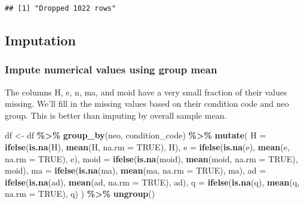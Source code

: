 \documentclass[
]{article}
\newenvironment{Shaded}{\begin{snugshade}}{\end{snugshade}}
\newcommand{\AttributeTok}[1]{\textcolor[rgb]{0.13,0.29,0.53}{#1}}
\newcommand{\ConstantTok}[1]{\textcolor[rgb]{0.56,0.35,0.01}{#1}}
\newcommand{\FunctionTok}[1]{\textcolor[rgb]{0.13,0.29,0.53}{\textbf{#1}}}
\newcommand{\NormalTok}[1]{#1}
\newcommand{\OtherTok}[1]{\textcolor[rgb]{0.56,0.35,0.01}{#1}}
\newcommand{\SpecialCharTok}[1]{\textcolor[rgb]{0.81,0.36,0.00}{\textbf{#1}}}
\begin{document}
\begin{verbatim}
## [1] "Dropped 1022 rows"
\end{verbatim}

\hypertarget{imputation}{%
\subsection{Imputation}\label{imputation}}

\hypertarget{impute-numerical-values-using-group-mean}{%
\subsubsection{Impute numerical values using group
mean}\label{impute-numerical-values-using-group-mean}}

The columns H, e, n, ma, and moid have a very small fraction of their
values missing. We'll fill in the missing values based on their
condition code and neo group. This is better than imputing by overall
sample mean.

\begin{Shaded}
\begin{Highlighting}[]
\NormalTok{df }\OtherTok{\textless{}{-}}\NormalTok{ df }\SpecialCharTok{\%\textgreater{}\%} \FunctionTok{group\_by}\NormalTok{(neo, condition\_code) }\SpecialCharTok{\%\textgreater{}\%}
  \FunctionTok{mutate}\NormalTok{(}
    \AttributeTok{H =} \FunctionTok{ifelse}\NormalTok{(}\FunctionTok{is.na}\NormalTok{(H), }\FunctionTok{mean}\NormalTok{(H, }\AttributeTok{na.rm =} \ConstantTok{TRUE}\NormalTok{), H),}
    \AttributeTok{e =} \FunctionTok{ifelse}\NormalTok{(}\FunctionTok{is.na}\NormalTok{(e), }\FunctionTok{mean}\NormalTok{(e, }\AttributeTok{na.rm =} \ConstantTok{TRUE}\NormalTok{), e),}
    \AttributeTok{moid =} \FunctionTok{ifelse}\NormalTok{(}\FunctionTok{is.na}\NormalTok{(moid), }\FunctionTok{mean}\NormalTok{(moid, }\AttributeTok{na.rm =} \ConstantTok{TRUE}\NormalTok{), moid),}
    \AttributeTok{ma =} \FunctionTok{ifelse}\NormalTok{(}\FunctionTok{is.na}\NormalTok{(ma), }\FunctionTok{mean}\NormalTok{(ma, }\AttributeTok{na.rm =} \ConstantTok{TRUE}\NormalTok{), ma),}
    \AttributeTok{ad =} \FunctionTok{ifelse}\NormalTok{(}\FunctionTok{is.na}\NormalTok{(ad), }\FunctionTok{mean}\NormalTok{(ad, }\AttributeTok{na.rm =} \ConstantTok{TRUE}\NormalTok{), ad),}
    \AttributeTok{q =} \FunctionTok{ifelse}\NormalTok{(}\FunctionTok{is.na}\NormalTok{(q), }\FunctionTok{mean}\NormalTok{(q, }\AttributeTok{na.rm =} \ConstantTok{TRUE}\NormalTok{), q)}
\NormalTok{  ) }\SpecialCharTok{\%\textgreater{}\%} \FunctionTok{ungroup}\NormalTok{()}
\end{Highlighting}
\end{Shaded}
\end{document}
